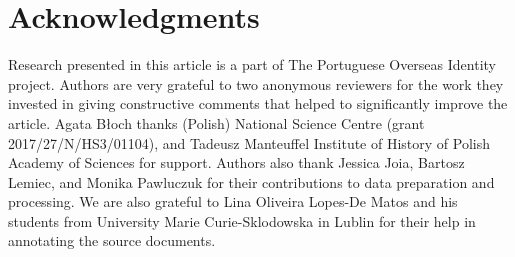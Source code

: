 \documentclass{article}
\begin{document}
\section*{Acknowledgments}
Research presented in this article is a part of The Portuguese Overseas Identity project. Authors are very grateful to two anonymous reviewers for the work they invested in giving constructive comments that helped to significantly improve the article.  Agata Błoch thanks (Polish) National Science Centre (grant 2017/27/N/HS3/01104), and Tadeusz Manteuffel Institute of History of Polish Academy of Sciences for support. Authors also thank Jessica Joia, Bartosz Lemiec, and Monika Pawluczuk for their contributions to data preparation and processing. We are also  grateful to Lina Oliveira Lopes-De Matos and his students from University Marie Curie-Sklodowska in Lublin for their help in annotating the source documents. 


  

\end{document}
